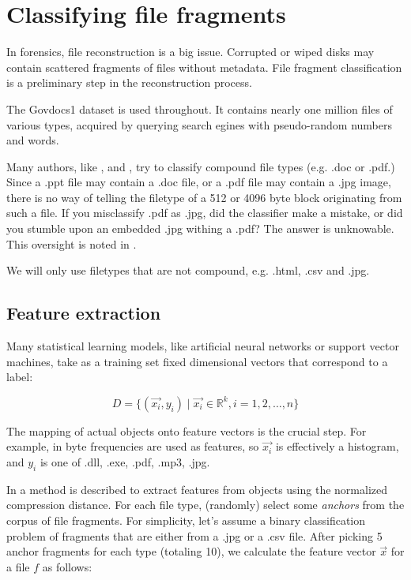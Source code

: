 \section{Classifying file fragments}

In forensics, file reconstruction is a big issue. Corrupted or wiped disks
may contain scattered fragments of files without metadata. File fragment
classification is a preliminary step in the reconstruction process.

The Govdocs1 dataset \cite{Garfinkel2009} is used throughout. It contains
nearly one million files of various types, acquired by querying search
egines with pseudo-random numbers and words.

Many authors, like \cite{Li2010}, \cite{Veenman2007} and
\cite{Axelsson2010}, try to classify compound file types (e.g. .doc or
.pdf.) Since a .ppt file may contain a .doc file, or a .pdf file may
contain a .jpg image, there is no way of telling the filetype of a 512 or
4096 byte block originating from such a file. If you misclassify .pdf as .jpg, did the classifier make a mistake, or did you stumble upon an embedded .jpg withing a .pdf? The answer is unknowable. This oversight is noted in \cite{Roussev2013}.

We will only use filetypes that are not compound, e.g. .html, .csv and
.jpg.

\subsection{Feature extraction}

Many statistical learning models, like artificial neural networks or
support vector machines, take as a training set fixed dimensional
vectors that correspond to a label:

\begin{equation}
  D = \{ (\vec{x_{i}}, y_{i}) \mid \vec{x_{i}} \in \mathbb{R}^{k}, i = 1, 2, \dots, n \}
\end{equation}

The mapping of actual objects onto feature vectors is the crucial step.
For example, in \cite{Li2010} byte frequencies are used as features, so
$\vec{x_{i}}$ is effectively a histogram, and $y_{i}$ is one of .dll,
.exe, .pdf, .mp3, .jpg.

In \cite{Cilibrasi2007} a method is described to extract features from
objects using the normalized compression distance. For each file type,
(randomly) select some \emph{anchors} from the corpus of file fragments.
For simplicity, let's assume a binary classification problem of fragments
that are either from a .jpg or a .csv file. After picking 5 anchor
fragments for each type (totaling 10), we calculate the feature vector $\vec{x}$ for a file $f$ as follows:


